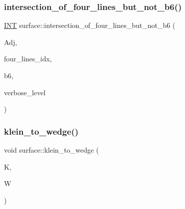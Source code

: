 \mbox{\label{classsurface_acf23708424714c52dc92c80ce5bb88b7}} 
\subsubsection{\texorpdfstring{intersection\+\_\+of\+\_\+four\+\_\+lines\+\_\+but\+\_\+not\+\_\+b6()}{intersection\_of\_four\_lines\_but\_not\_b6()}}
{\footnotesize\ttfamily \mbox{\hyperlink{galois_8h_a09fddde158a3a20bd2dcadb609de11dc}{I\+NT}} surface\+::intersection\+\_\+of\+\_\+four\+\_\+lines\+\_\+but\+\_\+not\+\_\+b6 (\begin{DoxyParamCaption}\item[{\mbox{\hyperlink{galois_8h_a09fddde158a3a20bd2dcadb609de11dc}{I\+NT}} $\ast$}]{Adj,  }\item[{\mbox{\hyperlink{galois_8h_a09fddde158a3a20bd2dcadb609de11dc}{I\+NT}} $\ast$}]{four\+\_\+lines\+\_\+idx,  }\item[{\mbox{\hyperlink{galois_8h_a09fddde158a3a20bd2dcadb609de11dc}{I\+NT}}}]{b6,  }\item[{\mbox{\hyperlink{galois_8h_a09fddde158a3a20bd2dcadb609de11dc}{I\+NT}}}]{verbose\+\_\+level }\end{DoxyParamCaption})}

\mbox{\label{classsurface_afe0396f2f4912d7b975c3c7f4bc5853b}} 
\subsubsection{\texorpdfstring{klein\+\_\+to\+\_\+wedge()}{klein\_to\_wedge()}\hspace{0.1cm}{\footnotesize\ttfamily [1/2]}}
{\footnotesize\ttfamily void surface\+::klein\+\_\+to\+\_\+wedge (\begin{DoxyParamCaption}\item[{\mbox{\hyperlink{galois_8h_a09fddde158a3a20bd2dcadb609de11dc}{I\+NT}} $\ast$}]{K,  }\item[{\mbox{\hyperlink{galois_8h_a09fddde158a3a20bd2dcadb609de11dc}{I\+NT}} $\ast$}]{W }\end{DoxyParamCaption})}

